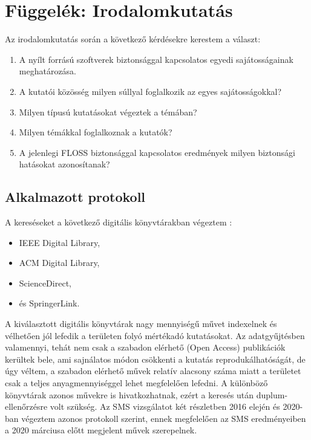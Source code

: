 \documentclass[12pt,magyar,a4paper,oneside]{scrreprt}
\providecommand{\tightlist}{%
  \setlength{\itemsep}{0pt}\setlength{\parskip}{0pt}}
\begin{document}
\listoffigures
{} 
\listoftables
\restoregeometry

\newpage
\appendix

\hypertarget{sec:IKUT}{%
\chapter{Függelék: Irodalomkutatás}\label{sec:IKUT}}

Az irodalomkutatás során a következő kérdésekre kerestem a választ:

\begin{enumerate}
\def\labelenumi{\alph{enumi}.}
\tightlist
\item
  A nyílt forrású szoftverek biztonsággal kapcsolatos egyedi
  sajátosságainak meghatározása.
\item
  A kutatói közösség milyen súllyal foglalkozik az egyes
  sajátosságokkal?
\item
  Milyen típusú kutatásokat végeztek a témában?
\item
  Milyen témákkal foglalkoznak a kutatók?
\item
  A jelenlegi FLOSS biztonsággal kapcsolatos eredmények milyen
  biztonsági hatásokat azonosítanak?
\end{enumerate}

\hypertarget{alkalmazott-protokoll}{%
\section{Alkalmazott protokoll}\label{alkalmazott-protokoll}}

A kereséseket a következő digitális könyvtárakban végeztem :

\begin{itemize}
\tightlist
\item
  IEEE Digital Library,
\item
  ACM Digital Library,
\item
  ScienceDirect,
\item
  és SpringerLink.
\end{itemize}

A kiválasztott digitális könyvtárak nagy mennyiségű művet indexelnek és
vélhetően jól lefedik a területen folyó mértékadó kutatásokat. Az
adatgyűjtésben valamennyi, tehát nem csak a szabadon elérhető (Open
Access) publikációk kerültek bele, ami sajnálatos módon csökkenti a
kutatás reprodukálhatóságát, de úgy véltem, a szabadon elérhető művek
relatív alacsony száma miatt a területet csak a teljes anyagmennyiséggel
lehet megfelelően lefedni. A különböző könyvtárak azonos művekre is
hivatkozhatnak, ezért a keresés után duplum-ellenőrzésre volt szükség.
Az SMS vizsgálatot két részletben 2016 elején és 2020-ban végeztem
azonos protokoll szerint, ennek megfelelően az SMS eredményeiben a 2020
márciusa előtt megjelent művek szerepelnek.
\end{document}
